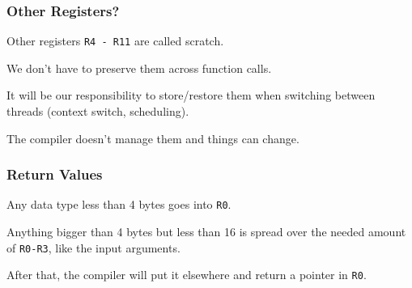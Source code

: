 \begin{frame}
\frametitle{Other Registers?}

Other registers \texttt{R4 - R11} are called \alert{scratch}.

We don't have to preserve them across function calls.

It will be our responsibility to store/restore them when switching between threads (context switch, scheduling).

The compiler doesn't manage them and things can change.

\end{frame}



\begin{frame}
\frametitle{Return Values}

Any data type less than 4 bytes goes into \texttt{R0}.

Anything bigger than 4 bytes but less than 16 is spread over the needed amount of \texttt{R0-R3}, like the input arguments.

After that, the compiler will put it elsewhere and return a pointer in \texttt{R0}.


\end{frame}





